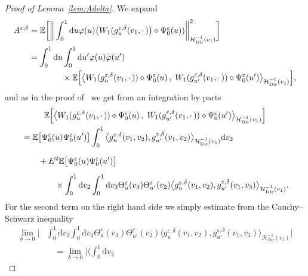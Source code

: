 \documentclass[10pt]{amsart}
\theoremstyle{definition}\newtheorem{defi}[theo]{Definition}\newtheorem{rema}[theo]{Remark}\newtheorem{exam}[theo]{Example}\newtheorem{exem}[theo]{Example}\newtheorem{nota}[theo]{Notation}
\DeclareMathOperator{\Dir}{Dir}
\newcommand{\mc}[1]{{\mathcal #1}}
\renewcommand{\mc}[1]{{\mathcal #1}}
\newcommand*{\dd}{\mathrm{d}}
\newcommand*{\du}{\dd u}
\newcommand*{\dv}{\dd v}
\begin{document}
\begin{proof}[Proof of Lemma~\ref{lem:Adelta}]
We expand
\begin{align}
A^{\varepsilon,\delta}& = \mathbb{E} \bigg[\bigg\| \int_0^1 \du \varphi (u) \big(W_1 (g^{\varepsilon, \delta}_u (v_1, \cdot\,)\big) \diamond \Psi^{\varepsilon}_0 (u)) \bigg\|_{\mc H_{\Dir}^{- 1} (v_1)}^2 \bigg] \notag\\
& = \int_0^1 \du \int_0^1 \du' \varphi (u) \varphi (u') \notag
\\
& \qquad \qquad \times \mathbb{E} \Big[\big\langle W_1 (g^{\varepsilon, \delta}_u (v_1, \cdot\,))
\diamond \Psi^{\varepsilon}_0 (u)\,,\; W_1 (g^{\varepsilon, \delta}_{u'} (v_1,
\cdot\,)) \diamond \Psi^{\varepsilon}_0 (u') \big\rangle_{\mc H_{\Dir}^{- 1} (v_1)}\Big],\label{eq:Aest}
\end{align}
and as in the proof of~\cite[Lemma~4.7]{Gubinelli2015Energy} we get from an integration by parts
\begin{multline}\label{eq:A-eps-delta-pr1}
\mathbb{E} \Big[\big\langle W_1 (g^{\varepsilon, \delta}_u (v_1, \cdot\,))\diamond \Psi^{\varepsilon}_0 (u)\,,\; W_1 (g^{\varepsilon, \delta}_{u'} (v_1,\cdot\,)) \diamond \Psi^{\varepsilon}_0 (u') \big\rangle_{\mc H_{\Dir}^{- 1} (v_1)} \Big] \\
\begin{aligned}
&=\mathbb{E} \big[\Psi^{\varepsilon}_0 (u) \Psi^{\varepsilon}_0 (u')\big] \int_0^1
\big\langle g^{\varepsilon, \delta}_u (v_1, v_2), g^{\varepsilon, \delta}_{u'} (v_1, v_2) \big\rangle_{\mc H_{\Dir}^{- 1}(v_1)} \dv_2\\
&\quad \quad + E^2 \mathbb{E} \big[\Psi^{\varepsilon}_0 (u) \Psi^{\varepsilon}_0 (u')\big] \vphantom{\int_0^1}\\
& \qquad \qquad \times \int_0^1 \dv_2 \int_0^1 \dv_3 \Theta^{\varepsilon}_u (v_3)
\Theta^{\varepsilon}_{u'} (v_2) \big\langle g^{\varepsilon, \delta}_u (v_1, v_2), g^{\varepsilon, \delta}_{u'} (v_1, v_3) \big\rangle_{\mc H_{\Dir}^{- 1}(v_1)}.
\end{aligned}
\end{multline}
For the second term on the right hand side we simply estimate from the Cauchy--Schwarz inequality
\begin{align*}
\lim_{\delta \rightarrow 0} \bigg| &\int_0^1 \dv_2 \int_0^1 \dv_3
\Theta^{\varepsilon}_u (v_3) \Theta^{\varepsilon}_{u'} (v_2) \big\langle g^{\varepsilon, \delta}_u (v_1, v_2), g^{\varepsilon, \delta}_{u'} (v_1, v_3) \big\rangle_{\mc H_{\Dir}^{- 1} (v_1)} \bigg|\\
&\quad = \lim_{\delta \rightarrow 0} \bigg| \bigg\langle \int_0^1 \dv_2

\end{align*}
\end{proof}
\end{document}

